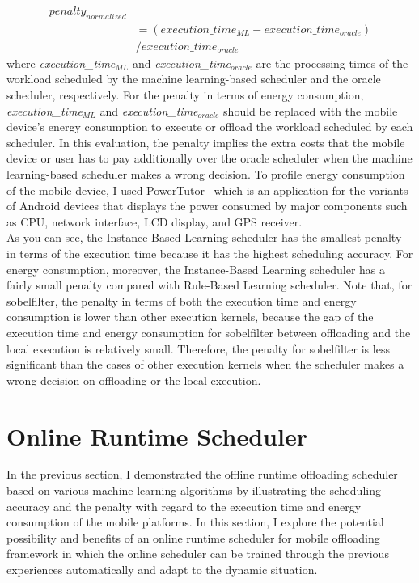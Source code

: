 %
\begin{equation}
\begin{split}
	penalty_{normalized} \\ 
		&	= (execution\_time_{ML} 
               - execution\_time_{oracle}) \\
        &        / execution\_time_{oracle}
\end{split}
\label{equ:penalty}
\end{equation}
%
where {\it execution\_time$_{ML}$} and 
{\it execution\_time$_{oracle}$} are the processing times 
of the workload scheduled by the machine learning-based scheduler 
and the oracle scheduler, respectively.
%
For the penalty in terms of energy consumption, 
{\it execution\_time$_{ML}$} and {\it execution\_time$_{oracle}$}
should be replaced with the mobile device's energy consumption to 
execute or offload the workload scheduled by each scheduler.
%
In this evaluation, the penalty implies the extra costs that the mobile
device or user has to pay additionally over the oracle scheduler when
the machine learning-based scheduler makes a wrong decision. 
%
To profile energy consumption of the mobile device, I used
PowerTutor~\cite{powertutor} which is an application for the variants of
Android devices that displays the power consumed by major components
such as CPU, network interface, LCD display, and GPS receiver.\\
%
As you can see, the Instance-Based Learning scheduler has the smallest
penalty in terms of the execution time because it has the highest
scheduling accuracy.
%
For energy consumption, moreover, the Instance-Based Learning scheduler has
a fairly small penalty compared with Rule-Based Learning scheduler.
%  
Note that, for sobelfilter, the penalty in terms of both the execution
time and energy consumption is lower than other execution kernels,
because the gap of the execution time and energy consumption for
sobelfilter between offloading and the local execution is relatively
small.
%
Therefore, the penalty for sobelfilter is less significant than the
cases of other execution kernels when the scheduler makes a wrong
decision on offloading or the local execution.
%

\section{Online Runtime Scheduler}
\label{scheduler:online}
%
In the previous section, I demonstrated the offline runtime offloading
scheduler based on various machine learning algorithms by illustrating
the scheduling accuracy and the penalty with regard to the execution
time and energy consumption of the mobile platforms.
%
In this section, I explore the potential possibility and benefits of an
online runtime scheduler for mobile offloading framework in which
the online scheduler can be trained through the previous experiences
automatically and adapt to the dynamic situation.
%
